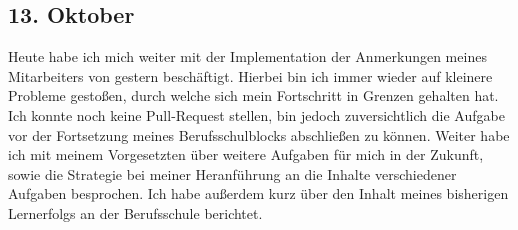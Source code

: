 \subsection{13. Oktober}
Heute habe ich mich weiter mit der Implementation der Anmerkungen meines Mitarbeiters von gestern beschäftigt. Hierbei bin ich immer wieder auf kleinere Probleme gestoßen, durch welche sich mein Fortschritt in Grenzen gehalten hat. Ich konnte noch keine Pull-Request stellen, bin jedoch zuversichtlich die Aufgabe vor der Fortsetzung meines Berufsschulblocks abschließen zu können. Weiter habe ich mit meinem Vorgesetzten über weitere Aufgaben für mich in der Zukunft, sowie die Strategie bei meiner Heranführung an die Inhalte verschiedener Aufgaben besprochen. Ich habe außerdem kurz über den Inhalt meines bisherigen Lernerfolgs an der Berufsschule berichtet.